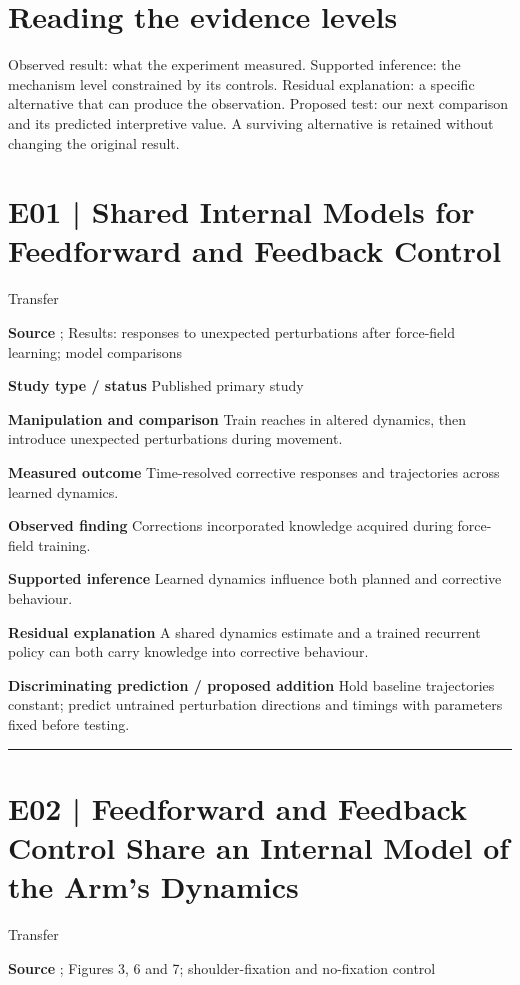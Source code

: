 \documentclass[11pt,a4paper]{article}
\begin{document}
\section{Reading the evidence levels}
Observed result: what the experiment measured. Supported inference: the mechanism level constrained by its controls. Residual explanation: a specific alternative that can produce the observation. Proposed test: our next comparison and its predicted interpretive value. A surviving alternative is retained without changing the original result.
\clearpage\section{E01 | Shared Internal Models for Feedforward and Feedback Control}
{\small\sffamily\color{navy} Transfer}\par
\textbf{Source} \cite{wagner2008}; Results: responses to unexpected perturbations after force-field learning; model comparisons\par
\textbf{Study type / status} Published primary study\par
\textbf{Manipulation and comparison} Train reaches in altered dynamics, then introduce unexpected perturbations during movement.\par
\textbf{Measured outcome} Time-resolved corrective responses and trajectories across learned dynamics.\par
\textbf{Observed finding} Corrections incorporated knowledge acquired during force-field training.\par
\textbf{Supported inference} Learned dynamics influence both planned and corrective behaviour.\par
\textbf{Residual explanation} A shared dynamics estimate and a trained recurrent policy can both carry knowledge into corrective behaviour.\par
\textbf{Discriminating prediction / proposed addition} Hold baseline trajectories constant; predict untrained perturbation directions and timings with parameters fixed before testing.\par
\bigskip\hrule\medskip\section{E02 | Feedforward and Feedback Control Share an Internal Model of the Arm's Dynamics}
{\small\sffamily\color{navy} Transfer}\par
\textbf{Source} \cite{maeda2018}; Figures 3, 6 and 7; shoulder-fixation and no-fixation control\par
\end{document}

